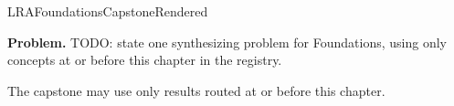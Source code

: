 \ifcsname LRAFoundationsCapstoneRendered\endcsname
\else
\expandafter\gdef\csname LRAFoundationsCapstoneRendered\endcsname{}

\newpage
{}
\label{cap:foundations}

\begin{tcolorbox}[
  colback=gray!6,
  colframe=gray!40,
  arc=2pt,
  left=8pt, right=8pt, top=6pt, bottom=6pt,
  title={\small\textbf{Capstone Problem}},
  fonttitle=\small\bfseries
]
\textbf{Problem.}
TODO: state one synthesizing problem for Foundations, using only concepts at or
before this chapter in the registry.
\end{tcolorbox}

\begin{remark*}
The capstone may use only results routed at or before this chapter.
\end{remark*}

\clearpage
\fi
